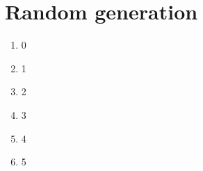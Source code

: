 \documentclass{article}
\begin{document}
  \section{Random generation}
  \label{sec:Random generation}
  \begin{enumerate}
                  \item 0
                  \item 1
                  \item 2
                  \item 3
                  \item 4
                  \item 5
          \end{enumerate}
\end{document}
